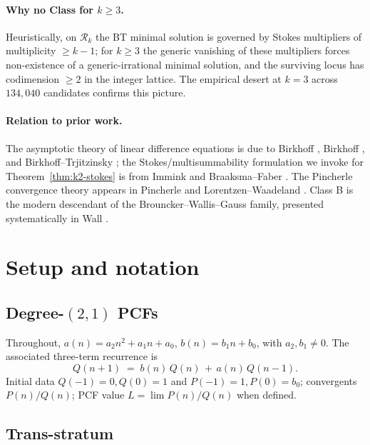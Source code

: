 \documentclass[11pt,a4paper]{article}
\theoremstyle{definition}
\begin{document}
\paragraph{Why no Class for $k\ge 3$.}
Heuristically, on $\mathcal{R}_k$ the BT minimal solution is governed by Stokes multipliers of multiplicity $\ge k-1$; for $k\ge 3$ the generic vanishing of these multipliers forces non-existence of a generic-irrational minimal solution, and the surviving locus has codimension $\ge 2$ in the integer lattice. The empirical desert at $k=3$ across $134{,}040$ candidates confirms this picture.

\paragraph{Relation to prior work.}
The asymptotic theory of linear difference equations is due to Birkhoff \cite{birkhoff1911}, Birkhoff \cite{birkhoff1930}, and Birkhoff--Trjitzinsky \cite{bt1932}; the Stokes/multisummability formulation we invoke for Theorem~\ref{thm:k2-stokes} is from Immink \cite{immink1984} and Braaksma--Faber \cite{braaksma-faber1996}. The Pincherle convergence theory appears in Pincherle \cite{pincherle1894} and Lorentzen--Waadeland \cite{lw1992}. Class B is the modern descendant of the Brouncker--Wallis--Gauss family, presented systematically in Wall \cite{wall1948}.

\section{Setup and notation}\label{sec:setup}

\subsection{Degree-$(2,1)$ PCFs}

Throughout, $a(n) = a_2 n^2 + a_1 n + a_0$, $b(n) = b_1 n + b_0$, with $a_2, b_1 \ne 0$. The associated three-term recurrence is
\begin{equation}\label{eq:recurrence}
  Q(n+1) \;=\; b(n)\,Q(n) \,+\, a(n)\,Q(n-1).
\end{equation}
Initial data $Q(-1)=0, Q(0)=1$ and $P(-1)=1, P(0)=b_0$; convergents $P(n)/Q(n)$; PCF value $L = \lim P(n)/Q(n)$ when defined.

\subsection{Trans-stratum}
\end{document}
